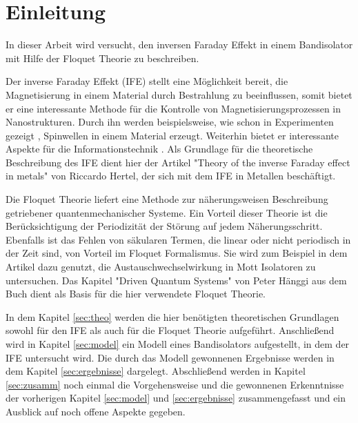 \chapter{Einleitung}
In dieser Arbeit wird versucht,
den inversen Faraday Effekt
in einem Bandisolator mit
Hilfe der Floquet Theorie
zu beschreiben.

Der inverse Faraday Effekt (IFE) stellt eine Möglichkeit bereit,
die Magnetisierung in einem Material
durch Bestrahlung zu beeinflussen,
somit bietet er eine interessante
Methode für die
Kontrolle von Magnetisierungsprozessen
 in Nanostrukturen.
Durch ihn werden beispielsweise, wie schon
in Experimenten gezeigt \cite{jackl},
Spinwellen in einem Material erzeugt.
Weiterhin bietet er interessante
Aspekte für die Informationstechnik \cite{hertel}.
Als Grundlage für die
theoretische Beschreibung des IFE dient hier
der Artikel "Theory of the inverse Faraday effect
in metals" \cite{hertel} von Riccardo
Hertel, der sich mit dem IFE in Metallen
beschäftigt.

Die Floquet Theorie liefert eine Methode
zur näherungsweisen Beschreibung
getriebener quantenmechanischer Systeme.
Ein Vorteil dieser Theorie ist
die Berücksichtigung der Periodizität
der Störung auf jedem Näherungsschritt.
Ebenfalls ist das Fehlen von
säkularen Termen, die linear oder nicht
periodisch in der Zeit sind, von Vorteil
im Floquet Formalismus.\cite{haenggi}
Sie wird zum Beispiel in dem Artikel \cite{mentink}
dazu genutzt, die Austauschwechselwirkung
in Mott Isolatoren zu untersuchen.
Das Kapitel
"Driven Quantum Systems"
von Peter Hänggi aus dem Buch \cite{haenggi}
dient als Basis für die hier verwendete Floquet Theorie.


In dem Kapitel \ref{sec:theo} werden die
hier benötigten theoretischen Grundlagen
sowohl für den IFE als auch für die Floquet Theorie aufgeführt.
Anschließend wird in Kapitel \ref{sec:model} ein
Modell eines Bandisolators aufgestellt,
in dem der IFE untersucht wird.
Die durch das Modell gewonnenen Ergebnisse
werden in dem Kapitel \ref{sec:ergebnisse} dargelegt.
Abschließend werden in Kapitel \ref{sec:zusamm}
noch einmal die Vorgehensweise
und die gewonnenen Erkenntnisse der vorherigen
Kapitel \ref{sec:model} und \ref{sec:ergebnisse}
zusammengefasst und ein Ausblick
auf noch offene Aspekte gegeben.


